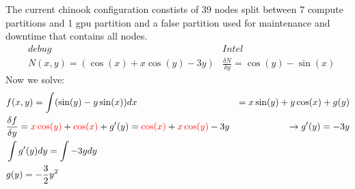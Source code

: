 \documentclass{article}
\begin{document}
\pagestyle{fancy}


The current chinook configuration constists of 39 nodes split between 7 compute partitions and 1 gpu partition and a false partition used for maintenance and downtime that contains all nodes.
\begin{align*}
    & debug & Intel \\
    & N(x,y) = (\cos(x) + x\cos(y) - 3y) & \frac{\delta N}{\delta y} = \cos(y) - \sin(x)
\end{align*}
Now we solve:
\begin{align}
    & f(x,y) = \int(\sin(y) - y\sin(x))dx & = x\sin(y) + y\cos(x) + g(y)\\
     &\frac{\delta f}{\delta y} = \textcolor{red}{x\cos(y)} + \textcolor{red}{\cos(x)} + g'(y) =
     \textcolor{red}{\cos(x)} + \textcolor{red}{x\cos(y)} - 3y & \rightarrow  g'(y) = -3y\\
     & \int g'(y)dy = \int -3ydy\\
     & g(y) = -\frac{3}{2}y^2
\end{align}
\end{document}
